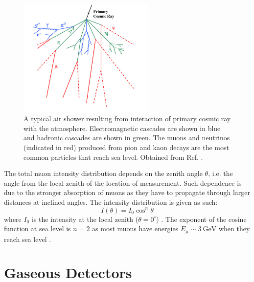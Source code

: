 \documentclass[a4paper]{report}
\numberwithin{equation}{section}
\begin{document}
\begin{figure}[!h]
	\centering
	\includegraphics[width=0.6\textwidth]{air_shower.png}
	\caption{A typical air shower resulting from interaction of primary cosmic ray with the atmosphere. Electromagnetic cascades are shown in blue and hadronic 
	cascades are shown in green. The muons and neutrinos (indicated in red) produced from pion and kaon decays are the most common particles that reach sea level.
	Obtained from Ref. \cite{Blanco2009}.}
	\label{fig:air_shower}	
\end{figure}

The total muon intensity distribution depends on the zenith angle $\theta$, i.e. the angle from the local zenith of the location of 
measurement. Such dependence is due to the stronger absorption of muons as they have to propagate through larger distances at 
inclined angles. The intensity distribution is given as such: 
\begin{equation}
    I(\theta) = I_0 \cos^n \theta 
	\label{eq:muon_intensity}
\end{equation}
where $I_0$ is the intensity at the local zenith ($\theta = 0^\circ$) \cite{Grupen2005}. The exponent of the cosine function at 
sea level is $n = 2$ as most muons have energies $E_\mu \sim \SI{3}{\giga\electronvolt}$ when they reach sea level \cite{Stefano2012}.

\section{Gaseous Detectors} \label{section:gas}
\end{document}
